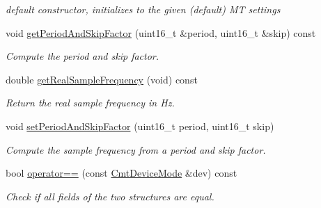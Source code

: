 \begin{DoxyCompactItemize}
\begin{DoxyCompactList}\small\item\em default constructor, initializes to the given (default) \-M\-T settings \end{DoxyCompactList}\item 
void \hyperlink{structCmtDeviceMode_aac114ecd95894dbe67f9db1547b5d5bc}{get\-Period\-And\-Skip\-Factor} (uint16\-\_\-t \&period, uint16\-\_\-t \&skip) const 
\begin{DoxyCompactList}\small\item\em \-Compute the period and skip factor. \end{DoxyCompactList}\item 
double \hyperlink{structCmtDeviceMode_afe99f245a600a82ac376d74d272ecc20}{get\-Real\-Sample\-Frequency} (void) const 
\begin{DoxyCompactList}\small\item\em \-Return the real sample frequency in \-Hz. \end{DoxyCompactList}\item 
void \hyperlink{structCmtDeviceMode_af926cf0d1d139b013b686d28c313eefc}{set\-Period\-And\-Skip\-Factor} (uint16\-\_\-t period, uint16\-\_\-t skip)
\begin{DoxyCompactList}\small\item\em \-Compute the sample frequency from a period and skip factor. \end{DoxyCompactList}\item 
\hypertarget{structCmtDeviceMode_a4757bbc0d4a5605ad627f594cc9da64d}{bool \hyperlink{structCmtDeviceMode_a4757bbc0d4a5605ad627f594cc9da64d}{operator==} (const \hyperlink{structCmtDeviceMode}{\-Cmt\-Device\-Mode} \&dev) const }\label{structCmtDeviceMode_a4757bbc0d4a5605ad627f594cc9da64d}

\begin{DoxyCompactList}\small\item\em \-Check if all fields of the two structures are equal. \end{DoxyCompactList}\end{DoxyCompactItemize}

